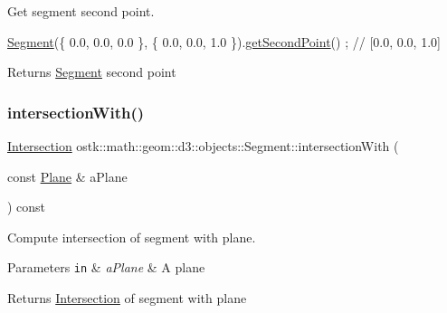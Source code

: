 Get segment second point. 


\begin{DoxyCode}
\hyperlink{classostk_1_1math_1_1geom_1_1d3_1_1objects_1_1_segment_aa2cb60ce06335a5f76120c658219494c}{Segment}(\{ 0.0, 0.0, 0.0 \}, \{ 0.0, 0.0, 1.0 \}).\hyperlink{classostk_1_1math_1_1geom_1_1d3_1_1objects_1_1_segment_a194f50a9505400681ba0bb15ae999465}{getSecondPoint}() ; \textcolor{comment}{// [0.0, 0.0, 1.0]}
\end{DoxyCode}


\begin{DoxyReturn}{Returns}
\hyperlink{classostk_1_1math_1_1geom_1_1d3_1_1objects_1_1_segment}{Segment} second point 
\end{DoxyReturn}
\mbox{\label{classostk_1_1math_1_1geom_1_1d3_1_1objects_1_1_segment_a0a2acca7fc6eb6d957a33381ab8bc6b1}} 
\subsubsection{\texorpdfstring{intersection\+With()}{intersectionWith()}}
{\footnotesize\ttfamily \hyperlink{classostk_1_1math_1_1geom_1_1d3_1_1_intersection}{Intersection} ostk\+::math\+::geom\+::d3\+::objects\+::\+Segment\+::intersection\+With (\begin{DoxyParamCaption}\item[{const \hyperlink{classostk_1_1math_1_1geom_1_1d3_1_1objects_1_1_plane}{Plane} \&}]{a\+Plane }\end{DoxyParamCaption}) const}



Compute intersection of segment with plane. 


\begin{DoxyParams}[1]{Parameters}
\mbox{\tt in}  & {\em a\+Plane} & A plane \\
\hline
\end{DoxyParams}
\begin{DoxyReturn}{Returns}
\hyperlink{classostk_1_1math_1_1geom_1_1d3_1_1_intersection}{Intersection} of segment with plane 
\end{DoxyReturn}
\mbox{\label{classostk_1_1math_1_1geom_1_1d3_1_1objects_1_1_segment_a0d26133252b257cf0d9553ac418200c5}} 
